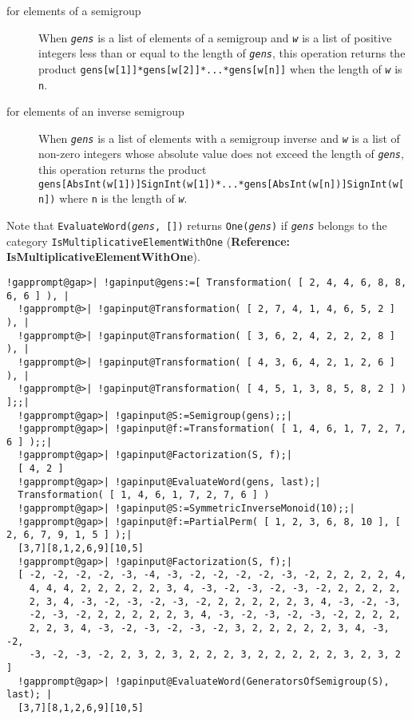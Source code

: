 \documentclass[a4paper,11pt]{report}
\begin{document}
{{{ 
\begin{description}
\item[{for elements of a semigroup}]  When \mbox{\texttt{\mdseries\slshape gens}} is a list of elements of a semigroup and \mbox{\texttt{\mdseries\slshape w}} is a list of positive integers less than or equal to the length of \mbox{\texttt{\mdseries\slshape gens}}, this operation returns the product \texttt{gens[w[1]]*gens[w[2]]*...*gens[w[n]]} when the length of \mbox{\texttt{\mdseries\slshape w}} is \texttt{n}. 
\item[{for elements of an inverse semigroup}]  When \mbox{\texttt{\mdseries\slshape gens}} is a list of elements with a semigroup inverse and \mbox{\texttt{\mdseries\slshape w}} is a list of non-zero integers whose absolute value does not exceed the length
of \mbox{\texttt{\mdseries\slshape gens}}, this operation returns the product \texttt{gens[AbsInt(w[1])]\texttt{}SignInt(w[1])*...*gens[AbsInt(w[n])]\texttt{}SignInt(w[n])} where \texttt{n} is the length of \mbox{\texttt{\mdseries\slshape w}}. 
\end{description}
 Note that \texttt{EvaluateWord(\mbox{\texttt{\mdseries\slshape gens}}, [])} returns \texttt{One(\mbox{\texttt{\mdseries\slshape gens}})} if \mbox{\texttt{\mdseries\slshape gens}} belongs to the category \texttt{IsMultiplicativeElementWithOne} (\textbf{Reference: IsMultiplicativeElementWithOne}). 
\begin{Verbatim}[commandchars=!@|,fontsize=\small,frame=single,label=Example]
  !gapprompt@gap>| !gapinput@gens:=[ Transformation( [ 2, 4, 4, 6, 8, 8, 6, 6 ] ), |
  !gapprompt@>| !gapinput@Transformation( [ 2, 7, 4, 1, 4, 6, 5, 2 ] ), |
  !gapprompt@>| !gapinput@Transformation( [ 3, 6, 2, 4, 2, 2, 2, 8 ] ), |
  !gapprompt@>| !gapinput@Transformation( [ 4, 3, 6, 4, 2, 1, 2, 6 ] ), |
  !gapprompt@>| !gapinput@Transformation( [ 4, 5, 1, 3, 8, 5, 8, 2 ] ) ];;|
  !gapprompt@gap>| !gapinput@S:=Semigroup(gens);;|
  !gapprompt@gap>| !gapinput@f:=Transformation( [ 1, 4, 6, 1, 7, 2, 7, 6 ] );;|
  !gapprompt@gap>| !gapinput@Factorization(S, f);|
  [ 4, 2 ]
  !gapprompt@gap>| !gapinput@EvaluateWord(gens, last);|
  Transformation( [ 1, 4, 6, 1, 7, 2, 7, 6 ] )
  !gapprompt@gap>| !gapinput@S:=SymmetricInverseMonoid(10);;|
  !gapprompt@gap>| !gapinput@f:=PartialPerm( [ 1, 2, 3, 6, 8, 10 ], [ 2, 6, 7, 9, 1, 5 ] );|
  [3,7][8,1,2,6,9][10,5]
  !gapprompt@gap>| !gapinput@Factorization(S, f);|
  [ -2, -2, -2, -2, -3, -4, -3, -2, -2, -2, -2, -3, -2, 2, 2, 2, 2, 4, 
    4, 4, 4, 2, 2, 2, 2, 2, 3, 4, -3, -2, -3, -2, -3, -2, 2, 2, 2, 2, 
    2, 3, 4, -3, -2, -3, -2, -3, -2, 2, 2, 2, 2, 2, 3, 4, -3, -2, -3, 
    -2, -3, -2, 2, 2, 2, 2, 2, 3, 4, -3, -2, -3, -2, -3, -2, 2, 2, 2, 
    2, 2, 3, 4, -3, -2, -3, -2, -3, -2, 3, 2, 2, 2, 2, 2, 3, 4, -3, -2, 
    -3, -2, -3, -2, 2, 3, 2, 3, 2, 2, 2, 3, 2, 2, 2, 2, 2, 3, 2, 3, 2 ]
  !gapprompt@gap>| !gapinput@EvaluateWord(GeneratorsOfSemigroup(S), last); |
  [3,7][8,1,2,6,9][10,5]
\end{Verbatim}
 }

}}
\end{document}
